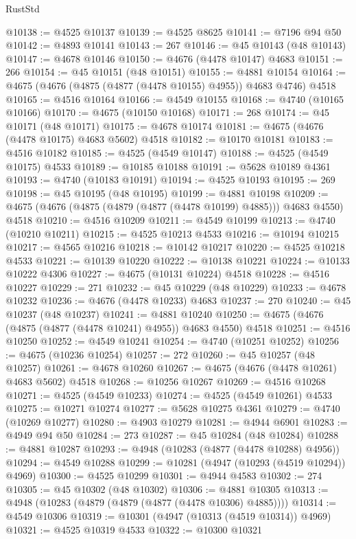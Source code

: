 \begin{lexlean}{RustStd}
\begin{coremodule}
@10138 := @4525 @10137
@10139 := @4525 @8625
@10141 := @7196 @94 @50
@10142 := @4893 @10141
@10143 := 267
@10146 := @45 @10143 (@48 @10143)
@10147 := @4678 @10146
@10150 := @4676 (@4478 @10147) @4683
@10151 := 266
@10154 := @45 @10151 (@48 @10151)
@10155 := @4881 @10154
@10164 := @4675 (@4676 (@4875 (@4877 (@4478 @10155) @4955)) @4683 @4746) @4518
@10165 := @4516 @10164
@10166 := @4549 @10155
@10168 := @4740 (@10165 @10166)
@10170 := @4675 (@10150 @10168)
@10171 := 268
@10174 := @45 @10171 (@48 @10171)
@10175 := @4678 @10174
@10181 := @4675 (@4676 (@4478 @10175) @4683 @5602) @4518
@10182 := @10170 @10181
@10183 := @4516 @10182
@10185 := @4525 (@4549 @10147)
@10188 := @4525 (@4549 @10175) @4533
@10189 := @10185 @10188
@10191 := @5628 @10189 @4361
@10193 := @4740 (@10183 @10191)
@10194 := @4525 @10193
@10195 := 269
@10198 := @45 @10195 (@48 @10195)
@10199 := @4881 @10198
@10209 := @4675 (@4676 (@4875 (@4879 (@4877 (@4478 @10199) @4885))) @4683 @4550) @4518
@10210 := @4516 @10209
@10211 := @4549 @10199
@10213 := @4740 (@10210 @10211)
@10215 := @4525 @10213 @4533
@10216 := @10194 @10215
@10217 := @4565 @10216
@10218 := @10142 @10217
@10220 := @4525 @10218 @4533
@10221 := @10139 @10220
@10222 := @10138 @10221
@10224 := @10133 @10222 @4306
@10227 := @4675 (@10131 @10224) @4518
@10228 := @4516 @10227
@10229 := 271
@10232 := @45 @10229 (@48 @10229)
@10233 := @4678 @10232
@10236 := @4676 (@4478 @10233) @4683
@10237 := 270
@10240 := @45 @10237 (@48 @10237)
@10241 := @4881 @10240
@10250 := @4675 (@4676 (@4875 (@4877 (@4478 @10241) @4955)) @4683 @4550) @4518
@10251 := @4516 @10250
@10252 := @4549 @10241
@10254 := @4740 (@10251 @10252)
@10256 := @4675 (@10236 @10254)
@10257 := 272
@10260 := @45 @10257 (@48 @10257)
@10261 := @4678 @10260
@10267 := @4675 (@4676 (@4478 @10261) @4683 @5602) @4518
@10268 := @10256 @10267
@10269 := @4516 @10268
@10271 := @4525 (@4549 @10233)
@10274 := @4525 (@4549 @10261) @4533
@10275 := @10271 @10274
@10277 := @5628 @10275 @4361
@10279 := @4740 (@10269 @10277)
@10280 := @4903 @10279
@10281 := @4944 @6901
@10283 := @4949 @94 @50
@10284 := 273
@10287 := @45 @10284 (@48 @10284)
@10288 := @4881 @10287
@10293 := @4948 (@10283 (@4877 (@4478 @10288) @4956))
@10294 := @4549 @10288
@10299 := @10281 (@4947 (@10293 (@4519 @10294)) @4969)
@10300 := @4525 @10299
@10301 := @4944 @4583
@10302 := 274
@10305 := @45 @10302 (@48 @10302)
@10306 := @4881 @10305
@10313 := @4948 (@10283 (@4879 (@4879 (@4877 (@4478 @10306) @4885))))
@10314 := @4549 @10306
@10319 := @10301 (@4947 (@10313 (@4519 @10314)) @4969)
@10321 := @4525 @10319 @4533
@10322 := @10300 @10321

\end{coremodule}
\end{lexlean}
